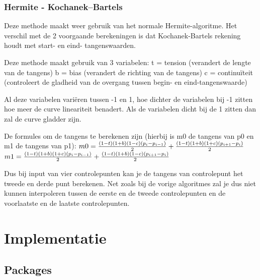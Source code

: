\documentclass[a4paper,11pt,oneside, titlepage]{article}
\begin{document}
\subsubsection{Hermite - Kochanek–Bartels}
Deze methode maakt weer gebruik van het normale Hermite-algoritme. Het verschil
met de 2 voorgaande berekeningen is dat Kochanek-Bartels rekening houdt met start- en eind-
tangenswaarden.

Deze methode maakt gebruik van 3 variabelen:\newline
t = tension (verandert de lengte van de tangens)\newline
b = bias (verandert de richting van de tangens)\newline
c = continu\"iteit (controleert de gladheid van de overgang tussen begin- en eind-tangenswaarde)
\newline

Al deze variabelen vari\"eren tussen -1 en 1, hoe dichter de variabelen bij -1 zitten hoe
meer de curve lineariteit benadert. Als de variabelen dicht bij de 1 zitten dan zal de curve
gladder zijn.\newline

De formules om de tangens te berekenen zijn (hierbij is m0 de tangens van p0 en m1 de tangens
van p1):\newline
$m0 = {{(1-t)(1+b)(1-c)(p_i-p_{i-1})}\over{2}} + {{(1-t)(1+b)(1+c)(p_{i+1}-p_i)}\over{2}}$\newline
$m1 = {{(1-t)(1+b)(1+c)(p_i-p_{i-1})}\over{2}} + {{(1-t)(1+b)(1-c)(p_{i+1}-p_i)}\over{2}}$\newline

Dus bij input van vier controlepunten kan je de tangens van controlepunt het tweede en derde
punt berekenen. Net zoals bij de vorige algoritmes zal je dus niet kunnen interpoleren tussen
de eerste en de tweede controlepunten en de voorlaatste en de laatste controlepunten.
\newpage
\section{Implementatie}
\subsection{Packages}
\end{document}
